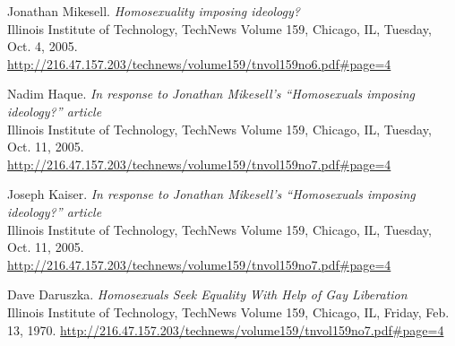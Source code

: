 \documentclass[a4paper,12pt]{article}
\begin{document}
\begin{thebibliography}{9}

Jonathan Mikesell.
\textit{Homosexuality imposing ideology?} \\
Illinois Institute of Technology, TechNews Volume 159, Chicago, IL, Tuesday, Oct. 4, 2005.
\url{http://216.47.157.203/technews/volume159/tnvol159no6.pdf#page=4}

Nadim Haque.
\textit{In response to Jonathan Mikesell's “Homosexuals imposing ideology?” article} \\
Illinois Institute of Technology, TechNews Volume 159, Chicago, IL, Tuesday, Oct. 11, 2005.
\url{http://216.47.157.203/technews/volume159/tnvol159no7.pdf#page=4}

Joseph Kaiser.
\textit{In response to Jonathan Mikesell's “Homosexuals imposing ideology?” article} \\
Illinois Institute of Technology, TechNews Volume 159, Chicago, IL, Tuesday, Oct. 11, 2005.
\url{http://216.47.157.203/technews/volume159/tnvol159no7.pdf#page=4}

Dave Daruszka.
\textit{Homosexuals Seek Equality With Help of Gay Liberation} \\
Illinois Institute of Technology, TechNews Volume 159, Chicago, IL, Friday, Feb. 13, 1970.
\url{http://216.47.157.203/technews/volume159/tnvol159no7.pdf#page=4}


\end{thebibliography}

\newpage

\end{document}
